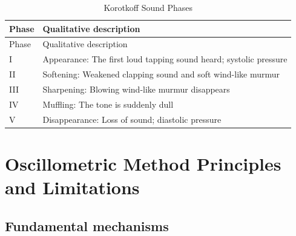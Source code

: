 \documentclass[
  12pt,
  letterpaper,
  openany,
  oneside]{book}
\begin{document}
\begin{longtable}[]{@{}
  >{\raggedright\arraybackslash}p{}
  >{\raggedright\arraybackslash}p{}@{}}
\caption{Korotkoff Sound Phases}\label{tbl-ksound-phases}\tabularnewline
\toprule\noalign{}
\begin{minipage}[b]{\linewidth}\raggedright
Phase
\end{minipage} & \begin{minipage}[b]{\linewidth}\raggedright
Qualitative description
\end{minipage} \\
\midrule\noalign{}
\endfirsthead
\toprule\noalign{}
\begin{minipage}[b]{\linewidth}\raggedright
Phase
\end{minipage} & \begin{minipage}[b]{\linewidth}\raggedright
Qualitative description
\end{minipage} \\
\midrule\noalign{}
\endhead
\bottomrule\noalign{}
\endlastfoot
I & Appearance: The first loud tapping sound heard; systolic pressure \\
II & Softening: Weakened clapping sound and soft wind-like murmur \\
III & Sharpening: Blowing wind-like murmur disappears \\
IV & Muffling: The tone is suddenly dull \\
V & Disappearance: Loss of sound; diastolic pressure \\
\end{longtable}

\section{Oscillometric Method Principles and
Limitations}\label{oscillometric-method-principles-and-limitations}

\subsection{Fundamental mechanisms}\label{fundamental-mechanisms}
\end{document}
